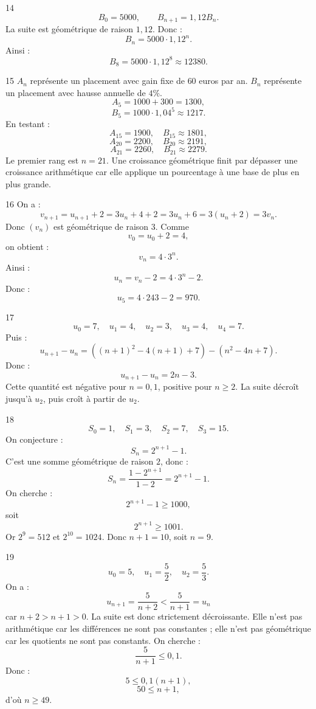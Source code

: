 \documentclass[11pt,a4paper]{article}
\begin{document}
\begin{solbox}{14}
\[
B_0=5000,\qquad B_{n+1}=1{,}12B_n.
\]
La suite est géométrique de raison \(1{,}12\). Donc :
\[
B_n=5000\cdot1{,}12^n.
\]
Ainsi :
\[
B_8=5000\cdot1{,}12^8\approx12380.
\]
\end{solbox}

\begin{solbox}{15}
\(A_n\) représente un placement avec gain fixe de \(60\) euros par an.  
\(B_n\) représente un placement avec hausse annuelle de \(4\%\).  
\[
A_5=1000+300=1300,
\]
\[
B_5=1000\cdot1{,}04^5\approx1217.
\]
En testant :
\[
A_{15}=1900,\quad B_{15}\approx1801,
\]
\[
A_{20}=2200,\quad B_{20}\approx2191,
\]
\[
A_{21}=2260,\quad B_{21}\approx2279.
\]
Le premier rang est \(n=21\). Une croissance géométrique finit par dépasser une croissance arithmétique car elle applique un pourcentage à une base de plus en plus grande.
\end{solbox}

\begin{solbox}{16}
On a :
\[
v_{n+1}=u_{n+1}+2=3u_n+4+2=3u_n+6=3(u_n+2)=3v_n.
\]
Donc \((v_n)\) est géométrique de raison \(3\). Comme
\[
v_0=u_0+2=4,
\]
on obtient :
\[
v_n=4\cdot3^n.
\]
Ainsi :
\[
u_n=v_n-2=4\cdot3^n-2.
\]
Donc :
\[
u_5=4\cdot243-2=970.
\]
\end{solbox}

\begin{solbox}{17}
\[
u_0=7,\quad u_1=4,\quad u_2=3,\quad u_3=4,\quad u_4=7.
\]
Puis :
\[
u_{n+1}-u_n=((n+1)^2-4(n+1)+7)-(n^2-4n+7).
\]
Donc :
\[
u_{n+1}-u_n=2n-3.
\]
Cette quantité est négative pour \(n=0,1\), positive pour \(n\geq2\). La suite décroît jusqu'à \(u_2\), puis croît à partir de \(u_2\).
\end{solbox}

\begin{solbox}{18}
\[
S_0=1,\quad S_1=3,\quad S_2=7,\quad S_3=15.
\]
On conjecture :
\[
S_n=2^{n+1}-1.
\]
C'est une somme géométrique de raison \(2\), donc :
\[
S_n=\frac{1-2^{n+1}}{1-2}=2^{n+1}-1.
\]
On cherche :
\[
2^{n+1}-1\geq1000,
\]
soit
\[
2^{n+1}\geq1001.
\]
Or \(2^9=512\) et \(2^{10}=1024\). Donc \(n+1=10\), soit \(n=9\).
\end{solbox}

\begin{solbox}{19}
\[
u_0=5,\quad u_1=\frac52,\quad u_2=\frac53.
\]
On a :
\[
u_{n+1}=\frac{5}{n+2}<\frac{5}{n+1}=u_n
\]
car \(n+2>n+1>0\). La suite est donc strictement décroissante.  
Elle n'est pas arithmétique car les différences ne sont pas constantes ; elle n'est pas géométrique car les quotients ne sont pas constants.  
On cherche :
\[
\frac{5}{n+1}\leq0{,}1.
\]
Donc :
\[
5\leq0{,}1(n+1),
\]
\[
50\leq n+1,
\]
d'où \(n\geq49\).
\end{solbox}
\end{document}
